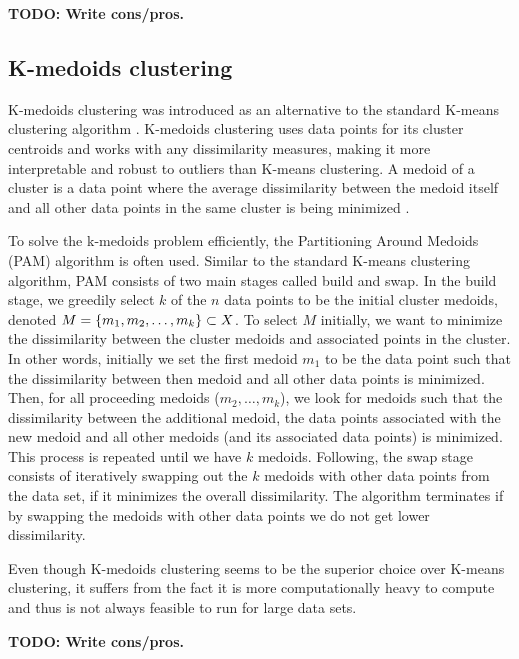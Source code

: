 \textbf{TODO: Write cons/pros.}

\subsection{K-medoids clustering}
\label{sec:k-medoids-clustering}
K-medoids clustering was introduced as an alternative to the standard K-means clustering algorithm \cites{Kaufman1990}[p. 427 - 428]{bishop2006}. K-medoids clustering uses data points for its cluster centroids and works with any dissimilarity measures, making it more interpretable and robust to outliers than K-means clustering. A medoid of a cluster is a data point where the average dissimilarity between the medoid itself and all other data points in the same cluster is being minimized \cite{Kaufman1990}.

To solve the k-medoids problem efficiently, the Partitioning Around Medoids (PAM) algorithm is often used. Similar to the standard K-means clustering algorithm, PAM consists of two main stages called build and swap. In the build stage, we greedily select $k$ of the $n$ data points to be the initial cluster medoids, denoted $M = \left\{m_1, m_2, \ldots, m_k\right\} \subset X$. To select $M$ initially, we want to minimize the dissimilarity between the cluster medoids and associated points in the cluster. In other words, initially we set the first medoid $m_1$ to be the data point such that the dissimilarity between then medoid and all other data points is minimized. Then, for all proceeding medoids ($m_2, \ldots, m_k$), we look for medoids such that the dissimilarity between the additional medoid, the data points associated with the new medoid and all other medoids (and its associated data points) is minimized. This process is repeated until we have $k$ medoids. Following, the swap stage consists of iteratively swapping out the $k$ medoids with other data points from the data set, if it minimizes the overall dissimilarity. The algorithm terminates if by swapping the medoids with other data points we do not get lower dissimilarity.

Even though K-medoids clustering seems to be the superior choice over K-means clustering, it suffers from the fact it is more computationally heavy to compute and thus is not always feasible to run for large data sets.

\textbf{TODO: Write cons/pros.}

